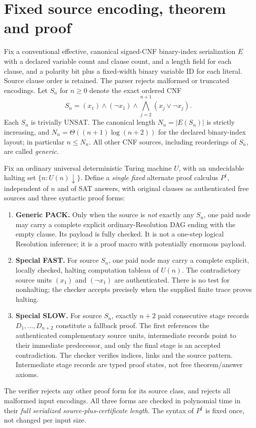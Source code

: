 \documentclass[11pt]{article}
\begin{document}
\section*{Fixed source encoding, theorem and proof}
Fix a conventional effective, canonical signed-CNF binary-index serialization $E$ with a declared variable count and clause count, and a length field for each clause, and a polarity bit plus a fixed-width binary variable ID for each literal. Source clause order is retained. The parser rejects malformed or truncated encodings. Let $S_n$ for $n\ge0$ denote the exact ordered CNF
\[
 S_n=(x_1)\land(\neg x_1)\land
 \bigwedge_{j=2}^{n+1}(x_j\lor\neg x_j).
\]
Each $S_n$ is trivially UNSAT. The canonical length $N_n=|E(S_n)|$ is strictly increasing, and $N_n=\Theta((n+1)\log(n+2))$ for the declared binary-index layout; in particular $n\le N_n$. All other CNF sources, including reorderings of $S_n$, are called \emph{generic}.

Fix an ordinary universal deterministic Turing machine $U$, with an undecidable halting set $\{n:U(n)\downarrow\}$. Define a \emph{single fixed} alternate proof calculus $P^\dagger$, independent of $n$ and of SAT answers, with original clauses as authenticated free sources and three syntactic proof forms:
\begin{enumerate}
\item[] \textbf{Generic PACK.} Only when the source is \emph{not} exactly any $S_n$, one paid node may carry a complete explicit ordinary-Resolution DAG ending with the empty clause. Its payload is fully checked. It is not a one-step logical Resolution inference; it is a proof macro with potentially enormous payload.
\item[] \textbf{Special FAST.} For source $S_n$, one paid node may carry a complete explicit, locally checked, halting computation tableau of $U(n)$. The contradictory source units $(x_1)$ and $(\neg x_1)$ are authenticated. There is no test for nonhalting; the checker accepts precisely when the supplied finite trace proves halting.
\item[] \textbf{Special SLOW.} For source $S_n$, exactly $n+2$ paid consecutive stage records $D_1,\ldots,D_{n+2}$ constitute a fallback proof. The first references the authenticated complementary source units, intermediate records point to their immediate predecessor, and only the final stage is an accepted contradiction. The checker verifies indices, links and the source pattern. Intermediate stage records are typed proof states, not free theorem/answer axioms.
\end{enumerate}
The verifier rejects any other proof form for its source class, and rejects all malformed input encodings. All three forms are checked in polynomial time in their \emph{full serialized source-plus-certificate length}. The syntax of $P^\dagger$ is fixed once, not changed per input size.
\end{document}
